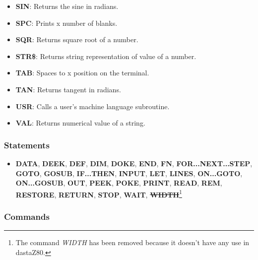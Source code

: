 \begin{itemize}
            \item \textbf{SIN}: Returns the sine in radians.
            \item \textbf{SPC}: Prints x number of blanks.
            \item \textbf{SQR}: Returns square root of a number.
            \item \textbf{STR\$}: Returns string representation of value of a number.
            \item \textbf{TAB}: Spaces to x position on the terminal.
            \item \textbf{TAN}: Returns tangent in radians.
            \item \textbf{USR}: Calls a user's machine language subroutine.
            \item \textbf{VAL}: Returns numerical value of a string.
        \end{itemize}

        \subsubsection{Statements}

        \begin{itemize}
            \item \textbf{DATA}, \textbf{DEEK}, \textbf{DEF}, \textbf{DIM},
            \textbf{DOKE}, \textbf{END}, \textbf{FN}, \textbf{FOR...NEXT...STEP},
            \textbf{GOTO}, \textbf{GOSUB}, \textbf{IF...THEN}, \textbf{INPUT},
            \textbf{LET}, \textbf{LINES}, \textbf{ON...GOTO}, \textbf{ON...GOSUB},
            \textbf{OUT}, \textbf{PEEK}, \textbf{POKE}, \textbf{PRINT},
            \textbf{READ}, \textbf{REM}, \textbf{RESTORE}, \textbf{RETURN},
            \textbf{STOP}, \textbf{WAIT}, \st{\textbf{WIDTH}}\footnote{The
            command \textit{WIDTH} has been removed because it doesn't have any
            use in dastaZ80.}
        \end{itemize}

        \subsubsection{Commands}

